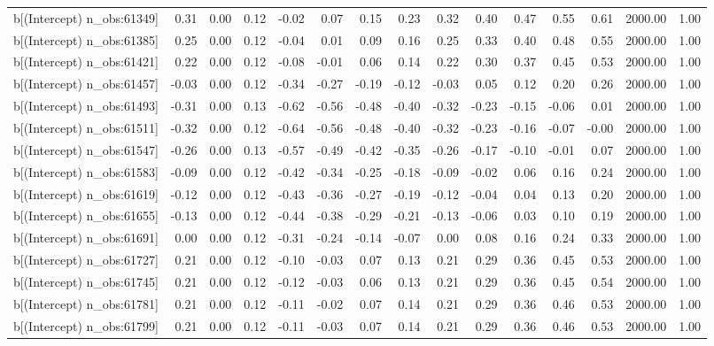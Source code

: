 \begin{table}[ht]
\begin{tabular}{rrrrrrrrrrrrrrr}
  b[(Intercept) n\_obs:61349] & 0.31 & 0.00 & 0.12 & -0.02 & 0.07 & 0.15 & 0.23 & 0.32 & 0.40 & 0.47 & 0.55 & 0.61 & 2000.00 & 1.00 \\ 
  b[(Intercept) n\_obs:61385] & 0.25 & 0.00 & 0.12 & -0.04 & 0.01 & 0.09 & 0.16 & 0.25 & 0.33 & 0.40 & 0.48 & 0.55 & 2000.00 & 1.00 \\ 
  b[(Intercept) n\_obs:61421] & 0.22 & 0.00 & 0.12 & -0.08 & -0.01 & 0.06 & 0.14 & 0.22 & 0.30 & 0.37 & 0.45 & 0.53 & 2000.00 & 1.00 \\ 
  b[(Intercept) n\_obs:61457] & -0.03 & 0.00 & 0.12 & -0.34 & -0.27 & -0.19 & -0.12 & -0.03 & 0.05 & 0.12 & 0.20 & 0.26 & 2000.00 & 1.00 \\ 
  b[(Intercept) n\_obs:61493] & -0.31 & 0.00 & 0.13 & -0.62 & -0.56 & -0.48 & -0.40 & -0.32 & -0.23 & -0.15 & -0.06 & 0.01 & 2000.00 & 1.00 \\ 
  b[(Intercept) n\_obs:61511] & -0.32 & 0.00 & 0.12 & -0.64 & -0.56 & -0.48 & -0.40 & -0.32 & -0.23 & -0.16 & -0.07 & -0.00 & 2000.00 & 1.00 \\ 
  b[(Intercept) n\_obs:61547] & -0.26 & 0.00 & 0.13 & -0.57 & -0.49 & -0.42 & -0.35 & -0.26 & -0.17 & -0.10 & -0.01 & 0.07 & 2000.00 & 1.00 \\ 
  b[(Intercept) n\_obs:61583] & -0.09 & 0.00 & 0.12 & -0.42 & -0.34 & -0.25 & -0.18 & -0.09 & -0.02 & 0.06 & 0.16 & 0.24 & 2000.00 & 1.00 \\ 
  b[(Intercept) n\_obs:61619] & -0.12 & 0.00 & 0.12 & -0.43 & -0.36 & -0.27 & -0.19 & -0.12 & -0.04 & 0.04 & 0.13 & 0.20 & 2000.00 & 1.00 \\ 
  b[(Intercept) n\_obs:61655] & -0.13 & 0.00 & 0.12 & -0.44 & -0.38 & -0.29 & -0.21 & -0.13 & -0.06 & 0.03 & 0.10 & 0.19 & 2000.00 & 1.00 \\ 
  b[(Intercept) n\_obs:61691] & 0.00 & 0.00 & 0.12 & -0.31 & -0.24 & -0.14 & -0.07 & 0.00 & 0.08 & 0.16 & 0.24 & 0.33 & 2000.00 & 1.00 \\ 
  b[(Intercept) n\_obs:61727] & 0.21 & 0.00 & 0.12 & -0.10 & -0.03 & 0.07 & 0.13 & 0.21 & 0.29 & 0.36 & 0.45 & 0.53 & 2000.00 & 1.00 \\ 
  b[(Intercept) n\_obs:61745] & 0.21 & 0.00 & 0.12 & -0.12 & -0.03 & 0.06 & 0.13 & 0.21 & 0.29 & 0.36 & 0.45 & 0.54 & 2000.00 & 1.00 \\ 
  b[(Intercept) n\_obs:61781] & 0.21 & 0.00 & 0.12 & -0.11 & -0.02 & 0.07 & 0.14 & 0.21 & 0.29 & 0.36 & 0.46 & 0.53 & 2000.00 & 1.00 \\ 
  b[(Intercept) n\_obs:61799] & 0.21 & 0.00 & 0.12 & -0.11 & -0.03 & 0.07 & 0.14 & 0.21 & 0.29 & 0.36 & 0.46 & 0.53 & 2000.00 & 1.00 \\ 

\end{tabular}
\end{table}
